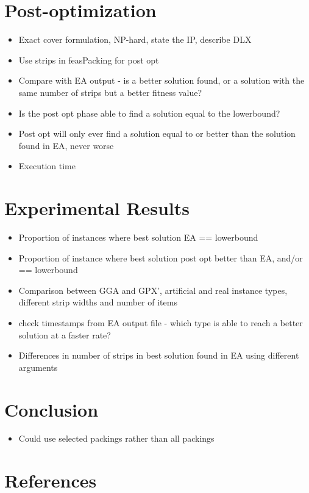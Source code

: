 \documentclass{elsarticle}
\begin{document}
\section{Post-optimization}
\begin{itemize}
	\item Exact cover formulation, NP-hard, state the IP, describe DLX
	\item Use strips in feasPacking for post opt
	\item Compare with EA output - is a better solution found, or a solution with the same number of strips but a better fitness value?
	\item Is the post opt phase able to find a solution equal to the lowerbound?
	\item Post opt will only ever find a solution equal to or better than the solution found in EA, never worse
	\item Execution time
\end{itemize}

\section{Experimental Results}
\begin{itemize}
	\item Proportion of instances where best solution EA == lowerbound
	\item Proportion of instance where best solution post opt better than EA, and/or == lowerbound
	\item Comparison between GGA and GPX', artificial and real instance types, different strip widths and number of items
	\item check timestamps from EA output file - which type is able to reach a better solution at a faster rate?
	\item Differences in number of strips in best solution found in EA using different arguments
\end{itemize}

\section{Conclusion}
\begin{itemize}
	\item Could use selected packings rather than all packings
\end{itemize}


\section*{References}

\end{document}
